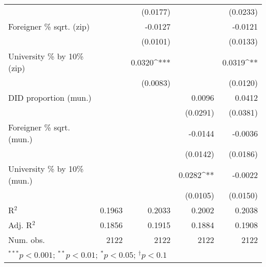 \begin{tabular}{l D{.}{.}{4.7} D{.}{.}{4.7} D{.}{.}{4.7} D{.}{.}{4.11}}
                                  &              & (0.0177)     &              & (0.0233)         \\
Foreigner \% sqrt. (zip)          &              & -0.0127      &              & -0.0121          \\
                                  &              & (0.0101)     &              & (0.0133)         \\
University \% by 10\% (zip)       &              & 0.0320^{***} &              & 0.0319^{**}      \\
                                  &              & (0.0083)     &              & (0.0120)         \\
DID proportion (mun.)             &              &              & 0.0096       & 0.0412           \\
                                  &              &              & (0.0291)     & (0.0381)         \\
Foreigner \% sqrt. (mun.)         &              &              & -0.0144      & -0.0036          \\
                                  &              &              & (0.0142)     & (0.0186)         \\
University \% by 10\% (mun.)      &              &              & 0.0282^{**}  & -0.0022          \\
                                  &              &              & (0.0105)     & (0.0150)         \\
\midrule
R$^2$                             & 0.1963       & 0.2033       & 0.2002       & 0.2038           \\
Adj. R$^2$                        & 0.1856       & 0.1915       & 0.1884       & 0.1908           \\
Num. obs.                         & 2122         & 2122         & 2122         & 2122             \\
\bottomrule
{}
\end{tabular}
